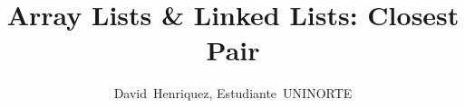 \documentclass[journal,onecolumn]{IEEEtran}
\begin{document}
\title{Array Lists \& Linked Lists: Closest Pair}
\author{David~Henriquez, {Estudiante~UNINORTE}}%
%
{}
\maketitle








\end{document}

